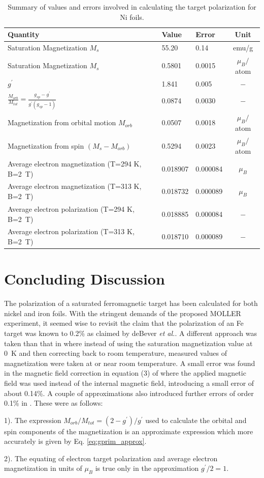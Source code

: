 \documentclass[12pt]{article}
\begin{document}
\begin{table}[h]
\begin{center}
\begin{tabular}{|l|l|l|c|}\hline
Quantity&Value&Error&Unit\\\hline
Saturation Magnetization $M_s$&55.20&0.14&emu/g\\
Saturation Magnetization $M_s$&0.5801&0.0015&$\mu_B/$atom\\
$g^{\prime}$&1.841&0.005&$-$\\
$\frac{M_{orb}}{M_{tot}}=\frac{g_{sp}-g^{\prime}}{g^{\prime}(g_{sp}-1)}$&0.0874&0.0030&$-$\\
Magnetization from orbital motion $M_{orb}$&0.0507&0.0018&$\mu_B/$atom\\
Magnetization from spin $(M_s-M_{orb})$&0.5294&0.0023&$\mu_B/$atom\\
Average electron magnetization (T=294 K, B=2~T)&0.018907&0.000084&$\mu_B$\\
Average electron magnetization (T=313 K, B=2~T)&0.018732&0.000089&$\mu_B$\\
Average electron polarization (T=294 K, B=2~T)&0.018885&0.000084&$-$\\
Average electron polarization (T=313 K, B=2~T)&0.018710&0.000089&$-$\\\hline
\end{tabular}
\end{center}
\caption{\label{tab:final_errors_Ni}Summary of values and errors involved in calculating the target polarization for Ni foils.}

\section{Concluding Discussion}\label{conclusions}
The polarization of a saturated ferromagnetic target has been calculated for both nickel and iron foils. With the stringent demands of the proposed MOLLER experiment, it seemed wise to revisit the claim that the polarization of an Fe target was known to 0.2\% as claimed by deBever {\it et al.}\cite{deBever1997}. A different approach was taken than that in \cite{deBever1997} where instead of using the saturation magnetization value at 0~K and then correcting back to room temperature, measured values of magnetization were taken at or near room temperature. A small error was found in the magnetic field correction in equation (3) of \cite{deBever1998} where the applied magnetic field was used instead of the internal magnetic field, introducing a small error of about 0.14\%. A couple of approximations also introduced further errors of order 0.1\% in \cite{deBever1997}. These were as follows: 

1). The expression $M_{orb}/M_{tot}=(2-g^{\prime})/g^{\prime}$ used to calculate the orbital and spin components of the magnetization is an approximate expression which more accurately is given by Eq. \ref{eq:gprim_approx}. 

2). The equating of electron target polarization and average electron magnetization in units of $\mu_B$ is true only in the approximation $g^{\prime}/2=1$. 

\end{table}
\FloatBarrier
%


\end{document}

